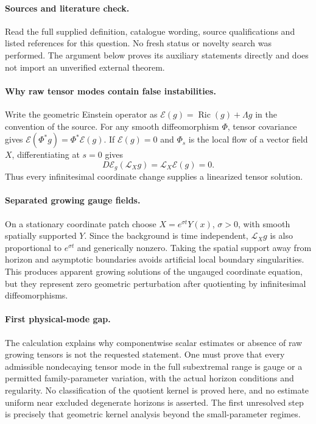 \documentclass[11pt]{article}
\begin{document}
\paragraph{Sources and literature check.}
Read the full supplied definition, catalogue wording, source qualifications and listed references for this question. No fresh status or novelty search was performed. The argument below proves its auxiliary statements directly and does not import an unverified external theorem.

\paragraph{Why raw tensor modes contain false instabilities.} Write the geometric Einstein operator as \(\mathcal E(g)=\operatorname{Ric}(g)+\Lambda g\) in the convention of the source. For any smooth diffeomorphism \(\Phi\), tensor covariance gives \(\mathcal E(\Phi^*g)=\Phi^*\mathcal E(g)\). If \(\mathcal E(g)=0\) and \(\Phi_s\) is the local flow of a vector field \(X\), differentiating at \(s=0\) gives
\[
 D\mathcal E_g(\mathcal L_Xg)=\mathcal L_X\mathcal E(g)=0.
\]
Thus every infinitesimal coordinate change supplies a linearized tensor solution.
\paragraph{Separated growing gauge fields.} On a stationary coordinate patch choose \(X=e^{\sigma t}Y(x)\), \(\sigma>0\), with smooth spatially supported \(Y\). Since the background is time independent, \(\mathcal L_Xg\) is also proportional to \(e^{\sigma t}\) and generically nonzero. Taking the spatial support away from horizon and asymptotic boundaries avoids artificial local boundary singularities. This produces apparent growing solutions of the ungauged coordinate equation, but they represent zero geometric perturbation after quotienting by infinitesimal diffeomorphisms.
\paragraph{First physical-mode gap.} The calculation explains why componentwise scalar estimates or absence of raw growing tensors is not the requested statement. One must prove that every admissible nondecaying tensor mode in the full subextremal range is gauge or a permitted family-parameter variation, with the actual horizon conditions and regularity. No classification of the quotient kernel is proved here, and no estimate uniform near excluded degenerate horizons is asserted. The first unresolved step is precisely that geometric kernel analysis beyond the small-parameter regimes.
\end{document}
